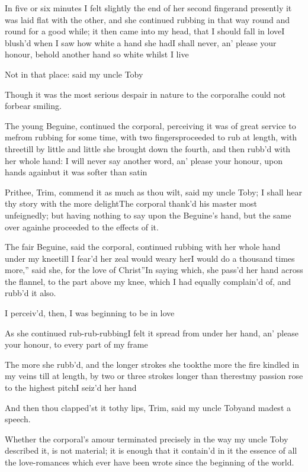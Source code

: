 \documentclass{article}
\begin{document}
In five or six minutes I felt slightly the end of
her second finger\tsk and presently it was laid flat with the
other, and she continued rubbing in that way round and round for a
good while; it then came into my head, that I should fall in
love\tsk\break I blush’d when I saw how white a hand she
had\tsk I shall never, an’ please your honour, behold
another hand so white whilst I live\tsh

\tsh Not in that place: said my uncle
Toby\tsh

Though it was the most serious des\-pair in nature to the
corporal\tsk he could not forbear smiling.

The young Beguine, continued the corporal, perceiving it
was of great service to me\tsk from rubbing for some time, with
two fingers\tsk proceeded to rub at length, with three\tsk till
by little and little she brought down the fourth, and then
rubb’d with her whole hand: I will never say another word,
an’ please your honour, upon hands again\tsk but it was
softer than satin\tsh

\tsh Prithee, Trim, commend it as much as thou
wilt, said my uncle Toby; I shall hear thy story with the
more delight\tsh The corporal thank’d his master
most unfeignedly; but having nothing to say upon the
Beguine’s hand, but the same over again\tsh he
proceeded to the effects of it.

The fair Beguine, said the corporal, continued rubbing with her whole
hand under my knee\tsk till I fear’d her zeal would weary
her\tsh \lqq I would do a\break
\lqq thousand times more,” said she, \lqq for\break
\lqq the love of Christ”\tsh In saying which,\break
she pass’d her hand across the flannel, to the part above my
knee, which I had equally complain’d of, and rubb’d it also.


I perceiv’d, then, I was beginning to be in
love\tsh

As she continued rub-rub-rubbing\tsk I felt it spread from
under her hand, an’ please your honour, to every part of my
frame\tsh

The more she rubb’d, and the longer strokes she
took\tsh the more the fire kindled in my veins \tsh till at length, by
two or three strokes longer than the\break rest\tsh my passion
rose to the highest pitch\tsh I seiz’d her
hand\tsh

\tsh And then thou clapped’st it to\break thy lips,
Trim, said my uncle Toby\tsh\break and madest a
speech.

Whether the corporal’s amour terminated precisely in the
way my uncle Toby described it, is not material; it is
enough that it contain'd in it the essence of all the love-romances
which ever have been wrote since the beginning of the world.
\end{document}
